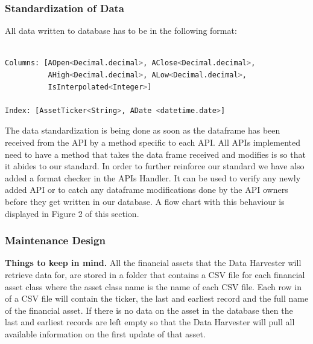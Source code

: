 \documentclass[main.tex]{subfiles}
\begin{document}
\subsubsection{Standardization of Data}
All data written to database has to be in the following format:
\begin{lstlisting}[language=Python, caption= Pandas Data Frame Format , label=lst:Development_env]

Columns: [AOpen<Decimal.decimal>, AClose<Decimal.decimal>,
          AHigh<Decimal.decimal>, ALow<Decimal.decimal>,
          IsInterpolated<Integer>] 
          
Index: [AssetTicker<String>, ADate <datetime.date>]
\end{lstlisting}

The data standardization is being done as soon as the dataframe has been received from the API by a method specific to each API. All APIs implemented need to have a method that takes the data frame received and modifies is so that it abides to our standard. In order to further reinforce our standard we have also added a format checker in the APIs Handler. It can be used to verify any newly added API or to catch any dataframe modifications done by the API owners before they get written in our database.  A flow chart with this behaviour is displayed in Figure 2 of this section. 


\subsubsection{Maintenance Design}
\textbf{Things to keep in mind.\newline}
All the financial assets that the Data Harvester will retrieve data for, are stored in a folder that contains a CSV file for each financial asset class where the asset class name is the name of each CSV file. Each row in of a CSV file will contain the ticker, the last and earliest record and the full name of the financial asset. If there is no data on the asset in the database then the last and earliest records are left empty so that the Data Harvester will pull all available information on the first update of that asset.\newline
\end{document}
